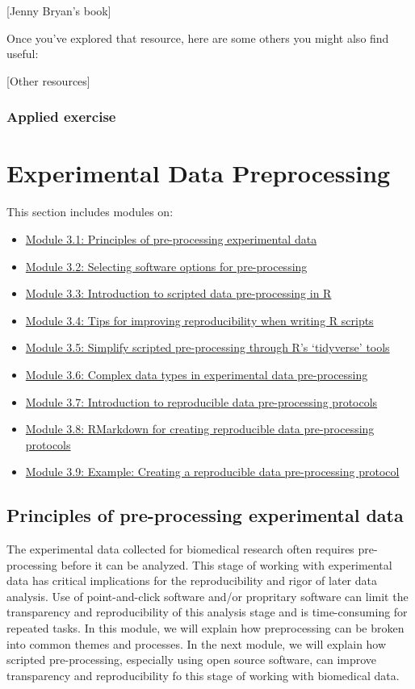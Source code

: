 \documentclass[]{tufte-book}
\providecommand{\tightlist}{%
  \setlength{\itemsep}{0pt}\setlength{\parskip}{0pt}}
\begin{document}
{[}Jenny Bryan's book{]}

Once you've explored that resource, here are some others you might also find
useful:

{[}Other resources{]}

\subsection{Applied exercise}\label{applied-exercise-2}

\chapter{Experimental Data Preprocessing}\label{experimental-data-preprocessing}

This section includes modules on:

\begin{itemize}
\tightlist
\item
  \hyperref[module12]{Module 3.1: Principles of pre-processing experimental data}
\item
  \hyperref[module12a]{Module 3.2: Selecting software options for pre-processing}
\item
  \hyperref[module13]{Module 3.3: Introduction to scripted data pre-processing in R}
\item
  \hyperref[module13a]{Module 3.4: Tips for improving reproducibility when writing R scripts}
\item
  \hyperref[module14]{Module 3.5: Simplify scripted pre-processing through R's `tidyverse' tools}
\item
  \hyperref[module15]{Module 3.6: Complex data types in experimental data pre-processing}
\item
  \hyperref[module18]{Module 3.7: Introduction to reproducible data pre-processing protocols}
\item
  \hyperref[module19]{Module 3.8: RMarkdown for creating reproducible data pre-processing protocols}
\item
  \hyperref[module20]{Module 3.9: Example: Creating a reproducible data pre-processing protocol}
\end{itemize}

\section{Principles of pre-processing experimental data}\label{module12}

The experimental data collected for biomedical research often requires
pre-processing before it can be analyzed. This stage of working with
experimental data has critical implications for the reproducibility and rigor of
later data analysis. Use of point-and-click software and/or propritary software
can limit the transparency and reproducibility of this analysis stage and is
time-consuming for repeated tasks. In this module, we will explain how
preprocessing can be broken into common themes and processes. In the next
module, we will explain how scripted pre-processing, especially using open
source software, can improve transparency and reproducibility fo this
stage of working with biomedical data.
\end{document}
